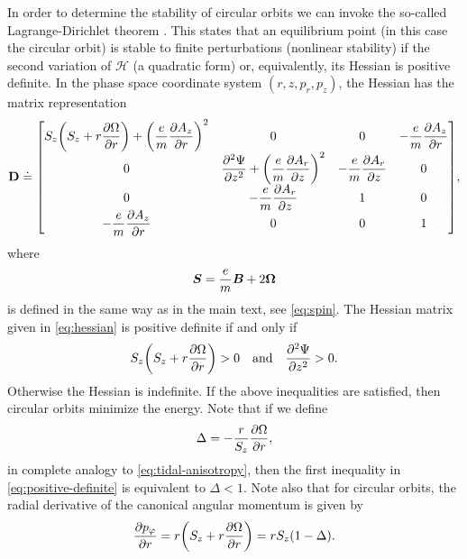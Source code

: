 \documentclass[aps,pre,notitlepage,amsmath,amssymb,amsfonts,nobibnotes,nofootinbib,superscriptaddress]{revtex4-1}
\begin{document}
In order to determine the stability of circular orbits we can invoke the
so-called Lagrange-Dirichlet theorem \citep[see e.g.][and references
therein]{Krechetnikov2007}. This states that an equilibrium point (in this
case the circular orbit) is stable to finite perturbations (nonlinear
stability) if the second variation of $\mathcal{H}$ (a quadratic form) or,
equivalently, its Hessian is positive definite. In the phase space coordinate
system $(r,z,p_r,p_z)$, the Hessian has the matrix representation
\begingroup
\renewcommand*{\arraystretch}{2.5}
\begin{equation}
  \label{eq:hessian}
  \mathbf{D} \doteq
  \begin{bmatrix}
    \displaystyle S_z\left(S_z + r\pder{\Omega}{r}\right)
    + {\left(\cm\pder{A_z}{r}\right)}^2 & 0 & 0
    & \displaystyle -\cm\pder{A_z}{r}
    \\
    0 & \displaystyle\pdder{\Psi}{z} + {\left(\cm\pder{A_r}{z}\right)}^2
    & \displaystyle -\cm\pder{A_r}{z} & 0 \\
    0 & \displaystyle -\cm\pder{A_r}{z} & 1 & 0 \\
    \displaystyle -\cm\pder{A_z}{r} & 0 & 0 & 1
  \end{bmatrix},
\end{equation}
\endgroup
where
\begin{equation}
  \label{eq:global-spin}
  \vec{S} = \cm\vec{B} + 2\vec{\Omega}
\end{equation}
is defined in the same way as in the main text, see \cref{eq:spin}. The
Hessian matrix given in \cref{eq:hessian} is positive definite if and only if
\begin{equation}
  \label{eq:positive-definite}
  S_z\left(S_z + r\pder{\Omega}{r}\right) > 0
  \quad\textrm{and}\quad
  \pdder{\Psi}{z} > 0.
\end{equation}
Otherwise the Hessian is indefinite. If the above inequalities are satisfied,
then circular orbits minimize the energy. Note that if we define
\begin{equation}
  \label{eq:global-tidal-anisotropy}
  \Delta = -\frac{r}{S_z}\pder{\Omega}{r},
\end{equation}
in complete analogy to \cref{eq:tidal-anisotropy}, then the first inequality
in \cref{eq:positive-definite} is equivalent to $\Delta<1$. Note also that for
circular orbits, the radial derivative of the canonical angular momentum is
given by
\begin{equation}
  \label{eq:angular-momentum-gradient}
  \pder{p_\varphi}{r} = r\left(S_z + r\pder{\Omega}{r}\right) =
  rS_z(1 - \Delta).
\end{equation}
\end{document}
